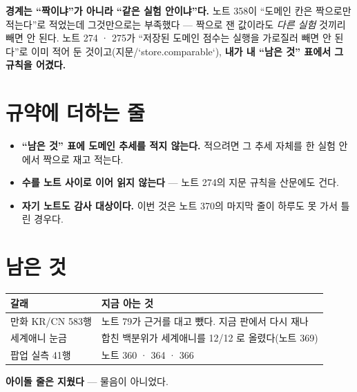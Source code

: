 \documentclass[11pt]{article}
\begin{document}
\textbf{경계는 ``짝이냐''가 아니라 ``같은 실험 안이냐''다.} 노트 358이
``도메인 칸은 짝으로만 적는다''로 적었는데 그것만으로는 부족했다 ---
짝으로 잰 값이라도 \emph{다른 실험} 것끼리 빼면 안 된다. 노트 274 · 275가
``저장된 도메인 점수는 실행을 가로질러 빼면 안 된다''로 이미 적어 둔
것이고(지문/`store.comparable`), \textbf{내가 내 ``남은 것'' 표에서 그
규칙을 어겼다.}

\section{규약에 더하는 줄}

\begin{itemize}
\item \textbf{``남은 것'' 표에 도메인 추세를 적지 않는다.} 적으려면 그
추세 자체를 한 실험 안에서 짝으로 재고 적는다.
\item \textbf{수를 노트 사이로 이어 읽지 않는다} --- 노트 274의 지문
규칙을 산문에도 건다.
\item \textbf{자기 노트도 감사 대상이다.} 이번 것은 노트 370의 마지막
줄이 하루도 못 가서 틀린 경우다.
\end{itemize}

\section{남은 것}

\begin{center}
\begin{tabular}{ll}
\hline
갈래 & 지금 아는 것 \\
\hline
만화 KR/CN 583행 & 노트 79가 근거를 대고 뺐다. 지금 판에서 다시 재나 \\
세계애니 눈금 & 합친 백분위가 세계애니를 12/12 로 올렸다(노트 369) \\
팝업 실측 41행 & 노트 360 · 364 · 366 \\
\hline
\end{tabular}
\end{center}

\textbf{아이돌 줄은 지웠다} --- 물음이 아니었다.
\end{document}
